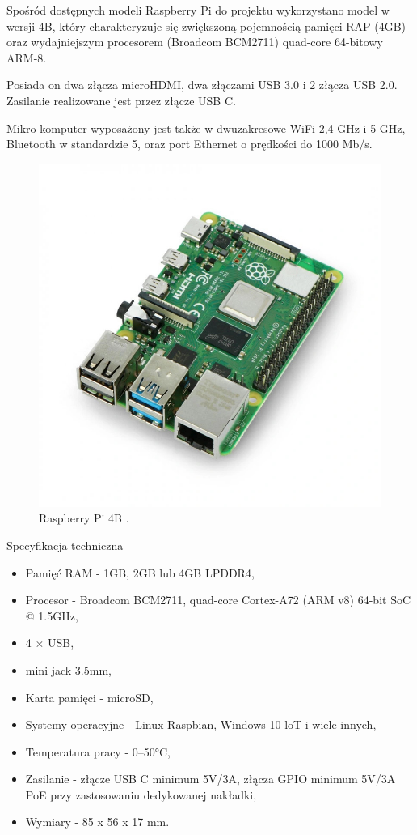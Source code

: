 \documentclass[a4paper,12pt,reqno]{article}
\begin{document}
Spośród dostępnych modeli Raspberry Pi do projektu wykorzystano model w wersji 4B, który charakteryzuje się zwiększoną pojemnością pamięci RAP (4GB) oraz wydajniejszym procesorem (Broadcom BCM2711) quad-core 64-bitowy ARM-8.

Posiada on dwa złącza microHDMI, dwa złączami USB 3.0 i 2 złącza USB 2.0. Zasilanie realizowane jest przez złącze USB C.

Mikro-komputer wyposażony jest także w dwuzakresowe WiFi 2,4 GHz i 5 GHz, Bluetooth w standardzie 5, oraz port Ethernet o prędkości do 1000 Mb/s.

\begin{figure}[H]%
\centering
\includegraphics[width=0.8\columnwidth]{imgs/raspberrypi4.jpg}
\caption{Raspberry Pi 4B \cite{img_rp4b}. \label{rp4b}}
\quad
\end{figure}

Specyfikacja techniczna

\begin{itemize}
	\item Pamięć RAM - 1GB, 2GB lub 4GB LPDDR4,
	\item Procesor - Broadcom BCM2711, quad-core Cortex-A72 (ARM v8) 64-bit SoC @ 1.5GHz,
	\item 4 × USB,
	\item mini jack 3.5mm,
	\item Karta pamięci - microSD,
	\item Systemy operacyjne - Linux Raspbian, Windows 10 loT i wiele innych,
	\item Temperatura pracy - 0–50°C,
	\item Zasilanie - złącze USB C minimum 5V/3A, złącza GPIO minimum 5V/3A PoE przy zastosowaniu dedykowanej nakładki,
	\item Wymiary - 85 x 56 x 17 mm.
\end{itemize}
\end{document}
